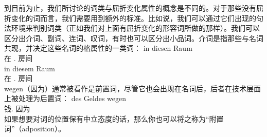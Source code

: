 到目前为止，我们所讨论的词类与屈折变化属性的概念是不同的。对于那些没有屈折变化的词而言，我们需要用到额外的标准。比如说，我们可以通过它们出现的句法环境来判别词类（正如我们对上面有屈折变化的形容词所做的那样）。我们可以区分出介词、副词、连词、叹词，有时也可以区分出小品词。介词是指那些与名词共现，并决定这些名词的格属性的一类词：
\eal
\ex 
\gll in diesen Raum\\
	 在 .\acc{} 房间\\
\ex 
\gll in diesem Raum\\
	 在 .\dat{} 房间\\
\zl
wegen（因为）通常被看作是前置词，尽管它也会出现在名词后，后者在技术层面上被处理为后置词：
\ea
\gll des Geldes wegen\\
	  钱.\gen{} 因为\\
\z
如果想要对词的位置保有中立态度的话，那么你也可以将之称为“附置词”（adposition）。

